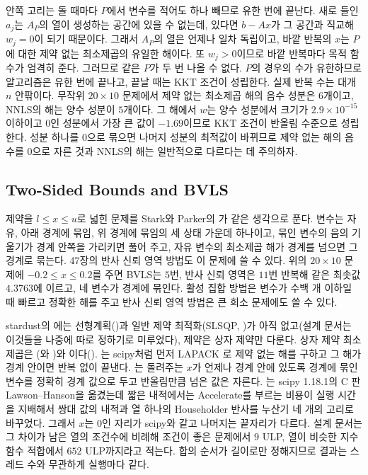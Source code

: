 안쪽 고리는 돌 때마다 $P$에서 변수를 적어도 하나 빼므로 유한 번에 끝난다. 새로 들인 $a_j$는 $A_P$의 열이 생성하는 공간에 있을 수 없는데, 있다면 $b-Ax$가 그 공간과 직교해 $w_j=0$이 되기 때문이다. 그래서 $A_P$의 열은 언제나 일차 독립이고, 바깥 반복의 $x$는 $P$에 대한 제약 없는 최소제곱의 유일한 해이다. 또 $w_j>0$이므로 바깥 반복마다 목적 함수가 엄격히 준다\cite{lawson1995}. 그러므로 같은 $P$가 두 번 나올 수 없다. $P$의 경우의 수가 유한하므로 알고리즘은 유한 번에 끝나고, 끝날 때는 KKT 조건이 성립한다. 실제 반복 수는 대개 $n$ 안팎이다. 무작위 $20\times10$ 문제에서 제약 없는 최소제곱 해의 음수 성분은 $6$개이고, NNLS의 해는 양수 성분이 $5$개이다. 그 해에서 $w$는 양수 성분에서 크기가 $2.9\times10^{-15}$ 이하이고 $0$인 성분에서 가장 큰 값이 $-1.69$이므로 KKT 조건이 반올림 수준으로 성립한다. 성분 하나를 $0$으로 묶으면 나머지 성분의 최적값이 바뀌므로 제약 없는 해의 음수를 $0$으로 자른 것과 NNLS의 해는 일반적으로 다르다는 데 주의하자.

\subsection{Two-Sided Bounds and BVLS}

제약을 $l\le x\le u$로 넓힌 문제를 Stark와 Parker의 가 같은 생각으로 푼다\cite{stark1995}. 변수는 자유, 아래 경계에 묶임, 위 경계에 묶임의 세 상태 가운데 하나이고, 묶인 변수의 음의 기울기가 경계 안쪽을 가리키면 풀어 주고, 자유 변수의 최소제곱 해가 경계를 넘으면 그 경계로 묶는다. 47장의 반사 신뢰 영역 방법도 이 문제에 쓸 수 있다. 위의 $20\times10$ 문제에 $-0.2\le x\le0.2$를 주면 BVLS는 $5$번, 반사 신뢰 영역은 $11$번 반복해 같은 최솟값 $4.3763$에 이르고, 네 변수가 경계에 묶인다. 활성 집합 방법은 변수가 수백 개 이하일 때 빠르고 정확한 해를 주고 반사 신뢰 영역 방법은 큰 희소 문제에도 쓸 수 있다.

\begin{instardust}
stardust의 에는 선형계획()과 일반 제약 최적화(SLSQP, )가 아직 없고(설계 문서는 이것들을 나중에 따로 정하기로 미루었다), 제약은 상자 제약만 다룬다. 상자 제약 최소제곱은 (와 )와 이다(). 는 scipy처럼 먼저 LAPACK 로 제약 없는 해를 구하고 그 해가 경계 안이면 반복 없이 끝낸다. 는 돌려주는 $x$가 언제나 경계 안에 있도록 경계에 묶인 변수를 정확히 경계 값으로 두고 반올림만큼 넘은 값은 자른다. 는 scipy 1.18.1의 C 판 Lawson--Hanson을 옮겼는데 짧은 내적에서는 Accelerate를 부르는 비용이 실행 시간을 지배해서 쌍대 값의 내적과 열 하나의 Householder 반사를 누산기 네 개의 고리로 바꾸었다. 그래서 $x$는 $0$인 자리가 scipy와 같고 나머지는 끝자리가 다르다. 설계 문서는 그 차이가 남은 열의 조건수에 비례해 조건이 좋은 문제에서 $9$ ULP, 열이 비슷한 지수 함수 적합에서 $652$ ULP까지라고 적는다. 합의 순서가 길이로만 정해지므로 결과는 스레드 수와 무관하게 실행마다 같다.
\end{instardust}

